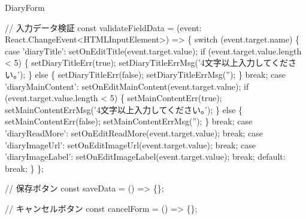 \begin{starterprogram}[]{DiaryForm}
{    // 入力データ検証
    const validateFieldData = (event: React.ChangeEvent\textless{}HTMLInputElement\textgreater{}) =\textgreater{} \{
      switch (event.target.name) \{
        case 'diaryTitle':
          setOnEditTitle(event.target.value);
          if (event.target.value.length \textless{} 5) \{
            setDiaryTitleErr(true);
            setDiaryTitleErrMsg('4文字以上入力してください。');
          \} else \{
            setDiaryTitleErr(false);
            setDiaryTitleErrMsg('');
          \}
          break;
        case 'diaryMainContent':
          setOnEditMainContent(event.target.value);
          if (event.target.value.length \textless{} 5) \{
            setMainContentErr(true);
            setMainContentErrMsg('4文字以上入力してください。');
          \} else \{
            setMainContentErr(false);
            setMainContentErrMsg('');
          \}
          break;
        case 'diaryReadMore':
          setOnEditReadMore(event.target.value);
          break;
        case 'diaryImageUrl':
          setOnEditImageUrl(event.target.value);
          break;
        case 'diaryImageLabel':
          setOnEditImageLabel(event.target.value);
          break;
        default:
          break;
      \}
    \};

    // 保存ボタン
    const saveData = () =\textgreater{} \{\};

    // キャンセルボタン
    const cancelForm = () =\textgreater{} \{\};

}
\end{starterprogram}
